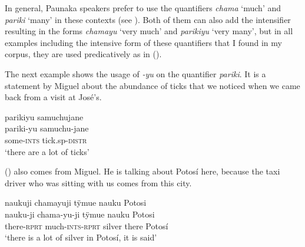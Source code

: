 In general, Paunaka speakers prefer to use the quantifiers \textit{chama} ‘much’ and \textit{pariki} ‘many’ in these contexts (see ). Both of them can also add the intensifier resulting in the forms \textit{chamayu} ‘very much’ and \textit{parikiyu} ‘very many’, but in all examples including the intensive form of these quantifiers that I found in my corpus, they are used predicatively as in ().

The next example shows the usage of \textit{-yu} on the quantifier \textit{pariki}. It is a statement by Miguel about the abundance of ticks that we noticed when we came back from a visit at José’s.

\ea\label{ex:parikiyu}
\begingl
\glpreamble parikiyu samuchujane\\
\gla pariki-yu samuchu-jane\\
\glb some-\textsc{ints} tick.sp-\textsc{distr}\\
\glft ‘there are a lot of ticks’
\endgl
\trailingcitation{[mrx-c120509l.148]}
\xe

() also comes from Miguel. He is talking about Potosí here, because the taxi driver who was sitting with us comes from this city.

\ea\label{ex:silver-Potosi-2}
\begingl
\glpreamble naukuji chamayuji tÿmue nauku Potosi\\
\gla nauku-ji chama-yu-ji tÿmue nauku Potosi\\
\glb there-\textsc{rprt} much-\textsc{ints}-\textsc{rprt} silver there Potosí\\
\glft ‘there is a lot of silver in Potosí, it is said’
\endgl
\trailingcitation{[mty-p110906l.229]}
\xe
{}



